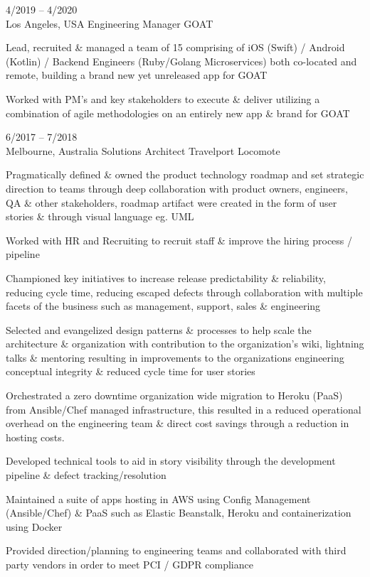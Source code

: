 \documentclass[9pt]{developercv} %
\begin{document}
\begin{entrylist}
	\entry
    {4/2019 -- 4/2020\\\footnotesize{Los Angeles, USA}}
		{Engineering Manager}
		{GOAT}
    {Lead, recruited \& managed a team of 15 comprising of iOS (Swift) / Android
    (Kotlin) / Backend Engineers (Ruby/Golang Microservices)  both co-located
    and remote, building a brand new yet unreleased app for GOAT
    \par\medskip Worked with PM’s and key stakeholders to execute \& deliver utilizing a
    combination of agile methodologies on an entirely new app \& brand for GOAT}
	\entry
		{6/2017 -- 7/2018\\\footnotesize{Melbourne, Australia}}
		{Solutions Architect}
		{Travelport Locomote}
    {
    Pragmatically defined \& owned the product technology roadmap and set
    strategic direction to teams through deep collaboration with product owners,
    engineers, QA \& other stakeholders, roadmap artifact were created in the form of user stories \& through visual language eg. UML
    \par\medskip Worked with HR and Recruiting to recruit staff \& improve the hiring process / pipeline
    \par\medskip Championed key initiatives to increase release predictability \& reliability, reducing cycle time, reducing escaped defects through
    collaboration with multiple facets of the business such as management, support, sales \& engineering
\par\medskip Selected and evangelized design patterns \& processes to help scale
  the architecture \& organization with contribution to the organization's wiki,
  lightning talks \& mentoring resulting in improvements to the organizations engineering conceptual integrity \& reduced cycle time for user stories
\par\medskip Orchestrated a zero downtime organization wide migration to Heroku (PaaS) from Ansible/Chef managed infrastructure, this resulted in a reduced operational overhead on the engineering team \& direct cost savings through a reduction in hosting costs.
\par\medskip Developed technical tools to aid in story visibility through the
    development pipeline \& defect tracking/resolution 
\par\medskip Maintained a suite of apps hosting in AWS using Config Management
    (Ansible/Chef) \& PaaS such as Elastic Beanstalk, Heroku and
    containerization using Docker
\par\medskip Provided direction/planning to engineering teams and collaborated with third party vendors in order to meet PCI / GDPR compliance
}
\end{entrylist}
\end{document}
